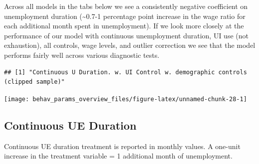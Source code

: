 \documentclass[
]{article}
\begin{document}
Across all models in the tabs below we see a consistently negative
coefficient on unemployment duration (\textasciitilde0.7-1 percentage
point increase in the wage ratio for each additional month spent in
unemployment). If we look more closely at the performance of our model
with continuous unemployment duration, UI use (not exhaustion), all
controls, wage levels, and outlier correction we see that the model
performs fairly well across various diagnostic tests.

\begin{verbatim}
## [1] "Continuous U Duration. w. UI Control w. demographic controls (clipped sample)"
\end{verbatim}

\begin{center}\texttt{[image: behav\_params\_overview\_files/figure-latex/unnamed-chunk-28-1]} \end{center}

\subsection{Continuous UE Duration}\label{continuous-ue-duration}

Continuous UE duration treatment is reported in monthly values. A
one-unit increase in the treatment variable = 1 additional month of
unemployment.
\end{document}
